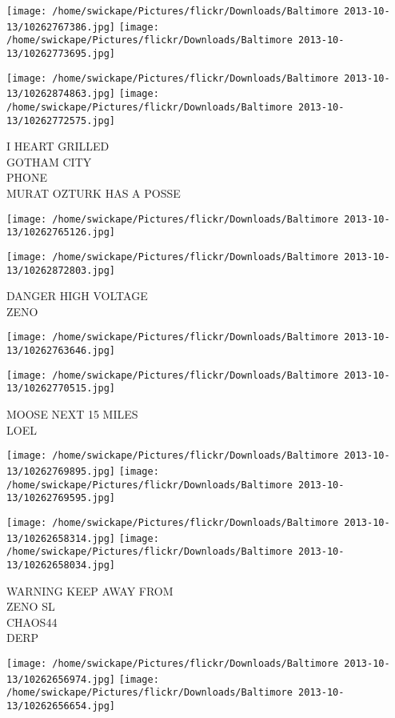 \documentclass[10pt,letterpaper]{article}
\begin{document}
\texttt{[image: /home/swickape/Pictures/flickr/Downloads/Baltimore 2013-10-13/10262767386.jpg]}
\texttt{[image: /home/swickape/Pictures/flickr/Downloads/Baltimore 2013-10-13/10262773695.jpg]}

\texttt{[image: /home/swickape/Pictures/flickr/Downloads/Baltimore 2013-10-13/10262874863.jpg]}
\texttt{[image: /home/swickape/Pictures/flickr/Downloads/Baltimore 2013-10-13/10262772575.jpg]}

I HEART GRILLED\\
GOTHAM CITY\\
PHONE\\
MURAT OZTURK HAS A POSSE
\pagebreak

\texttt{[image: /home/swickape/Pictures/flickr/Downloads/Baltimore 2013-10-13/10262765126.jpg]}

\vspace{0.25in}
\texttt{[image: /home/swickape/Pictures/flickr/Downloads/Baltimore 2013-10-13/10262872803.jpg]}

DANGER HIGH VOLTAGE\\
ZENO
\pagebreak

\texttt{[image: /home/swickape/Pictures/flickr/Downloads/Baltimore 2013-10-13/10262763646.jpg]}

\vspace{0.25in}
\texttt{[image: /home/swickape/Pictures/flickr/Downloads/Baltimore 2013-10-13/10262770515.jpg]}

MOOSE NEXT 15 MILES\\
LOEL
\pagebreak

\texttt{[image: /home/swickape/Pictures/flickr/Downloads/Baltimore 2013-10-13/10262769895.jpg]}
\texttt{[image: /home/swickape/Pictures/flickr/Downloads/Baltimore 2013-10-13/10262769595.jpg]}

\texttt{[image: /home/swickape/Pictures/flickr/Downloads/Baltimore 2013-10-13/10262658314.jpg]}
\texttt{[image: /home/swickape/Pictures/flickr/Downloads/Baltimore 2013-10-13/10262658034.jpg]}

WARNING KEEP AWAY FROM\\
ZENO SL\\
CHAOS44\\
DERP
\pagebreak

\texttt{[image: /home/swickape/Pictures/flickr/Downloads/Baltimore 2013-10-13/10262656974.jpg]}
\texttt{[image: /home/swickape/Pictures/flickr/Downloads/Baltimore 2013-10-13/10262656654.jpg]}
\end{document}
